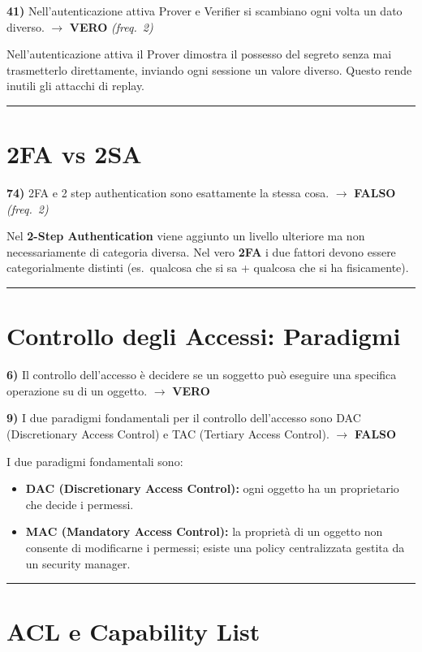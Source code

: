 \documentclass[12pt, a4paper]{report}
\newcommand{\vero}{\textcolor{verdeanswer}{\textbf{VERO}}}
\newcommand{\falso}{\textcolor{rossoanswer}{\textbf{FALSO}}}
\newcommand{\freq}[1]{\textcolor{freqcolor}{\textit{(freq.\ #1)}}}
\begin{document}
\noindent\textbf{41)} Nell'autenticazione attiva Prover e Verifier si scambiano ogni volta un dato diverso. $\to$ \vero{} \freq{2}

\medskip
\noindent Nell'autenticazione attiva il Prover dimostra il possesso del segreto senza mai trasmetterlo direttamente, inviando ogni sessione un valore diverso. Questo rende inutili gli attacchi di replay.

\noindent\rule{\textwidth}{0.4pt}

\section{2FA vs 2SA}

\noindent\textbf{74)} 2FA e 2 step authentication sono esattamente la stessa cosa. $\to$ \falso{} \freq{2}

\medskip
\noindent Nel \textbf{2-Step Authentication} viene aggiunto un livello ulteriore ma non necessariamente di categoria diversa. Nel vero \textbf{2FA} i due fattori devono essere categorialmente distinti (es.\ qualcosa che si sa + qualcosa che si ha fisicamente).

\noindent\rule{\textwidth}{0.4pt}

\section{Controllo degli Accessi: Paradigmi}

\noindent\textbf{6)} Il controllo dell'accesso è decidere se un soggetto può eseguire una specifica operazione su di un oggetto. $\to$ \vero{}

\medskip
\noindent\textbf{9)} I due paradigmi fondamentali per il controllo dell'accesso sono DAC (Discretionary Access Control) e TAC (Tertiary Access Control). $\to$ \falso{}

\medskip
\noindent I due paradigmi fondamentali sono:
\begin{itemize}
    \item \textbf{DAC (Discretionary Access Control):} ogni oggetto ha un proprietario che decide i permessi.
    \item \textbf{MAC (Mandatory Access Control):} la proprietà di un oggetto non consente di modificarne i permessi; esiste una policy centralizzata gestita da un security manager.
\end{itemize}

\noindent\rule{\textwidth}{0.4pt}

\section{ACL e Capability List}
\end{document}
